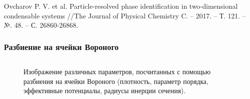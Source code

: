 \documentclass[pdf,hyperref={unicode}]{beamer}
\begin{document}
\begin{frame}
\begin{columns}
\end{columns}

\vspace{17mm}
\tiny{
Ovcharov P. V. et al. Particle-resolved phase identification in two-dimensional condensable systems //The Journal of Physical Chemistry C. – 2017. – Т. 121. – №. 48. – С. 26860-26868.
}

\end{frame}



\begin{frame}%
\transdissolve[duration=0.2]
\frametitle{Разбиение на ячейки Вороного}

\begin{columns}


\begin{column}{0.47\linewidth}
\begin{figure}[h]

\caption{ \tiny Изображение различных параметров, посчитанных с помощью разбиения на ячейки Вороного (плотность, параметр порядка, эффективные потенциалы, радиусы инерции сечения).}
\end{figure}
\end{column}


\begin{column}{0.47\linewidth}


\end{column}
\end{columns}
\end{frame}
\end{document}
